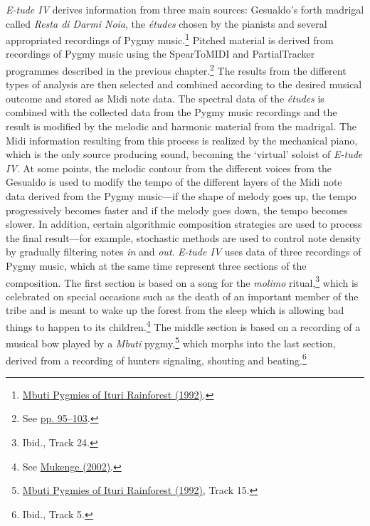 \emph{E-tude IV} derives information from three main sources: Gesualdo's forth madrigal called \emph{Resta di Darmi Noia}, the \emph{\'{e}tudes} chosen by the pianists and several appropriated recordings of Pygmy music.\footnote{\hyperlink{pygmy}{Mbuti Pygmies of Ituri Rainforest (1992)}.} Pitched material is derived from recordings of Pygmy music using the SpearToMIDI and PartialTracker programmes described in the previous chapter.\footnote{See \hyperlink{spectrack}{pp. 95--103}.} The results from the different types of analysis are then selected and combined according to the desired musical outcome and stored as Midi note data. The spectral data of the \emph{\'{e}tudes} is combined with the collected data from the Pygmy music recordings and the result is modified by the melodic and harmonic material from the madrigal. The Midi information resulting from this process is realized by the mechanical piano, which is the only source producing sound, becoming the `virtual' soloist of \emph{E-tude IV}. At some points, the melodic contour from the different voices from the Gesualdo is used to modify the tempo of the different layers of the Midi note data derived from the Pygmy music---if the shape of melody goes up, the tempo progressively becomes faster and if the melody goes down, the tempo becomes slower. In addition, certain algorithmic composition strategies are used to process the final result---for example, stochastic methods are used to control note density by gradually filtering notes \emph{in} and \emph{out}. \emph{E-tude IV} uses data of three recordings of Pygmy music, which at the same time represent three sections of the composition. The first section is based on a song for the \emph{molimo} ritual,\footnote{Ibid., Track 24.} which is celebrated on special occasions such as the death of an important member of the tribe and is meant to wake up the forest from the sleep which is allowing bad things to happen to its children.\footnote{See \hyperlink{mukenge}{Mukenge (2002)}.} The middle section is based on a recording of a musical bow played by a \emph{Mbuti} pygmy,\footnote{\hyperlink{pygmy}{Mbuti Pygmies of Ituri Rainforest (1992)}, Track 15.} which morphs into the last section, derived from a recording of hunters signaling, shouting and beating.\footnote{Ibid., Track 5.}

